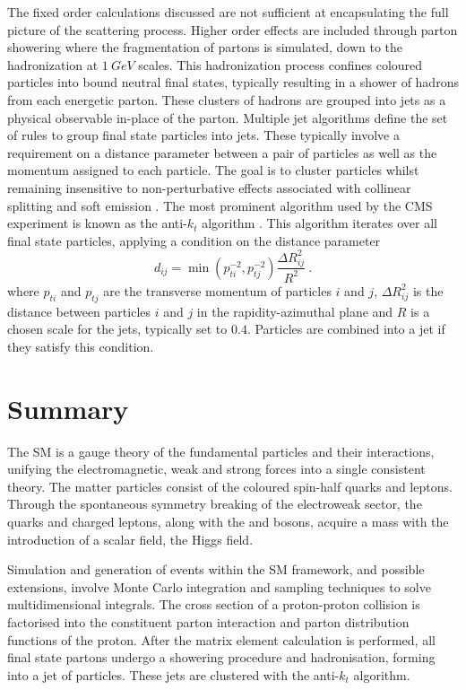 The fixed order calculations discussed are not sufficient at encapsulating the full picture of the scattering process. Higher order effects are included through parton showering where the fragmentation of partons is simulated, down to the hadronization at $\SI{1}{GeV}$ scales. This hadronization process confines coloured particles into bound neutral final states, typically resulting in a shower of hadrons from each energetic parton. These clusters of hadrons are grouped into jets as a physical observable in-place of the parton. Multiple jet algorithms define the set of rules to group final state particles into jets. These typically involve a requirement on a distance parameter between a pair of particles as well as the momentum assigned to each particle. The goal is to cluster particles whilst remaining insensitive to non-perturbative effects associated with collinear splitting and soft emission \cite{Buckley:2011ms}. The most prominent algorithm used by the CMS experiment is known as the anti-$k_t$ algorithm \cite{Salam:2009jx}. This algorithm iterates over all final state particles, applying a condition on the distance parameter
%
\begin{equation}
    d_{ij} = \min\left(p_{ti}^{-2},p_{tj}^{-2}\right)\frac{\Delta R_{ij}^2}{R^2}\ .
\end{equation}
%
where $p_{ti}$ and $p_{tj}$ are the transverse momentum of particles $i$ and $j$, $\Delta R_{ij}^2$ is the distance between particles $i$ and $j$ in the rapidity-azimuthal plane and $R$ is a chosen scale for the jets, typically set to $0.4$. Particles are combined into a jet if they satisfy this condition.


\section{Summary}

The SM is a gauge theory of the fundamental particles and their interactions,
unifying the electromagnetic, weak and strong forces into a single consistent
theory. The matter particles consist of the coloured spin-half quarks and
leptons. Through the spontaneous symmetry breaking of the electroweak sector,
the quarks and charged leptons, along with the \PW and \PZ bosons, acquire a
mass with the introduction of a scalar field, the Higgs field.

Simulation and generation of events within the SM framework, and possible
extensions, involve Monte Carlo integration and sampling techniques to solve
multidimensional integrals. The cross section of a proton-proton collision is
factorised into the constituent parton interaction and parton distribution functions of the proton.
After the matrix element calculation is performed, all final state
partons undergo a showering procedure and hadronisation, forming into a jet of
particles. These jets are clustered with the anti-$k_t$ algorithm.